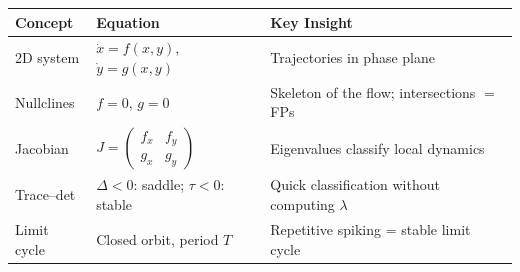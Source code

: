 \begin{chaptersummary}

\begin{center}
\renewcommand{\arraystretch}{1.6}
\begin{tabularx}{\textwidth}{@{}l X X@{}}
  \toprule
  \textbf{Concept} & \textbf{Equation} & \textbf{Key Insight} \\
  \midrule
  2D system &
  $\dot{x} = f(x,y)$, $\dot{y} = g(x,y)$ &
  Trajectories in phase plane \\
  Nullclines &
  $f = 0$, $g = 0$ &
  Skeleton of the flow; intersections $=$ FPs \\
  Jacobian &
  $\displaystyle J = \begin{pmatrix} f_x & f_y \\ g_x & g_y \end{pmatrix}$ &
  Eigenvalues classify local dynamics \\
  Trace--det &
  $\Delta < 0$: saddle; $\tau < 0$: stable &
  Quick classification without computing $\lambda$ \\
  Limit cycle &
  Closed orbit, period $T$ &
  Repetitive spiking = stable limit cycle \\
  \bottomrule
\end{tabularx}
\end{center}

\end{chaptersummary}

